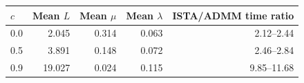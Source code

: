 \begin{tabular}{lrrrr}
\toprule
$c$ & Mean $L$ & Mean $\mu$ & Mean $\lambda$ & ISTA/ADMM time ratio \\
\midrule
0.0 & 2.045 & 0.314 & 0.063 & 2.12--2.44 \\
0.5 & 3.891 & 0.148 & 0.072 & 2.46--2.84 \\
0.9 & 19.027 & 0.024 & 0.115 & 9.85--11.68 \\
\bottomrule
\end{tabular}
